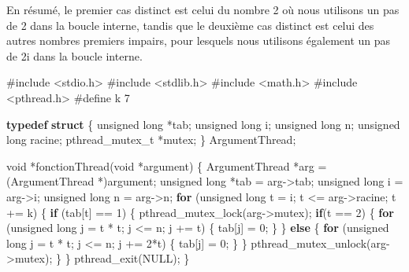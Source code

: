 \documentclass[
    ]{article}
\newenvironment{Shaded}{}{}
\newcommand{\ControlFlowTok}[1]{\textcolor[rgb]{0.00,0.44,0.13}{\textbf{#1}}}
\newcommand{\DataTypeTok}[1]{\textcolor[rgb]{0.56,0.13,0.00}{#1}}
\newcommand{\DecValTok}[1]{\textcolor[rgb]{0.25,0.63,0.44}{#1}}
\newcommand{\ImportTok}[1]{#1}
\newcommand{\KeywordTok}[1]{\textcolor[rgb]{0.00,0.44,0.13}{\textbf{#1}}}
\newcommand{\NormalTok}[1]{#1}
\newcommand{\PreprocessorTok}[1]{\textcolor[rgb]{0.74,0.48,0.00}{#1}}
\begin{document}
En résumé, le premier cas distinct est celui du nombre 2 où nous
utilisons un pas de 2 dans la boucle interne, tandis que le deuxième cas
distinct est celui des autres nombres premiers impairs, pour lesquels
nous utilisons également un pas de 2i dans la boucle interne.

\begin{Shaded}
\begin{Highlighting}[]
\PreprocessorTok{\#include }\ImportTok{\textless{}stdio.h\textgreater{}}
\PreprocessorTok{\#include }\ImportTok{\textless{}stdlib.h\textgreater{}}
\PreprocessorTok{\#include }\ImportTok{\textless{}math.h\textgreater{}}
\PreprocessorTok{\#include }\ImportTok{\textless{}pthread.h\textgreater{}}
\PreprocessorTok{\#define k 7}

\KeywordTok{typedef} \KeywordTok{struct}
\NormalTok{\{}
    \DataTypeTok{unsigned} \DataTypeTok{long}\NormalTok{ *tab;}
    \DataTypeTok{unsigned} \DataTypeTok{long}\NormalTok{ i;}
    \DataTypeTok{unsigned} \DataTypeTok{long}\NormalTok{ n;}
    \DataTypeTok{unsigned} \DataTypeTok{long}\NormalTok{ racine;}
\NormalTok{    pthread\_mutex\_t *mutex;}
\NormalTok{\} ArgumentThread;}

\DataTypeTok{void}\NormalTok{ *fonctionThread(}\DataTypeTok{void}\NormalTok{ *argument)}
\NormalTok{\{}
\NormalTok{    ArgumentThread *arg = (ArgumentThread *)argument;}
    \DataTypeTok{unsigned} \DataTypeTok{long}\NormalTok{ *tab = arg{-}\textgreater{}tab;}
    \DataTypeTok{unsigned} \DataTypeTok{long}\NormalTok{ i = arg{-}\textgreater{}i;}
    \DataTypeTok{unsigned} \DataTypeTok{long}\NormalTok{ n = arg{-}\textgreater{}n;}
    \ControlFlowTok{for}\NormalTok{ (}\DataTypeTok{unsigned} \DataTypeTok{long}\NormalTok{ t = i; t \textless{}= arg{-}\textgreater{}racine; t += k)}
\NormalTok{    \{}
        \ControlFlowTok{if}\NormalTok{ (tab[t] == }\DecValTok{1}\NormalTok{)}
\NormalTok{        \{}
\NormalTok{            pthread\_mutex\_lock(arg{-}\textgreater{}mutex);}
            \ControlFlowTok{if}\NormalTok{(t == }\DecValTok{2}\NormalTok{)}
\NormalTok{            \{}
                \ControlFlowTok{for}\NormalTok{ (}\DataTypeTok{unsigned} \DataTypeTok{long}\NormalTok{ j = t * t; j \textless{}= n; j += t)}
\NormalTok{                \{}
\NormalTok{                    tab[j] = }\DecValTok{0}\NormalTok{;}
\NormalTok{                \}}
\NormalTok{            \}}
            \ControlFlowTok{else}
\NormalTok{            \{}
                \ControlFlowTok{for}\NormalTok{ (}\DataTypeTok{unsigned} \DataTypeTok{long}\NormalTok{ j = t * t; j \textless{}= n; j += }\DecValTok{2}\NormalTok{*t)}
\NormalTok{                \{}
\NormalTok{                    tab[j] = }\DecValTok{0}\NormalTok{;}
\NormalTok{                \}}
\NormalTok{            \}}
\NormalTok{            pthread\_mutex\_unlock(arg{-}\textgreater{}mutex);}
\NormalTok{        \}}
\NormalTok{    \}}
\NormalTok{    pthread\_exit(NULL);}
\NormalTok{\}}


\end{Highlighting}
\end{Shaded}
\end{document}
